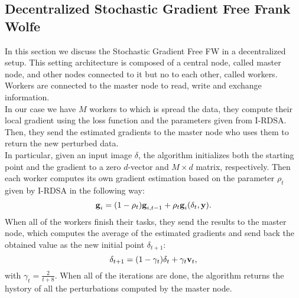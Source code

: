 \subsection{Decentralized Stochastic Gradient Free Frank Wolfe}
In this section we discuss the Stochastic Gradient Free FW in a decentralized setup. This setting architecture is composed of a central node, called master node, and other nodes connected to it but no to each other, called workers.
Workers are connected to the master node to read, write and exchange information.\\
In our case we have $M$ workers to which is spread the data, they compute their local gradient using the loss function and the parameters given from I-RDSA. Then, they send the estimated gradients to the master node who uses them to return the new perturbed data.\\
In particular, given an input image \boldmath$\delta$, the algorithm initializes both the starting point and the gradient to a zero $d$-vector and $M \times d$ matrix, respectively. Then each worker computes its own gradient estimation based on the parameter $\rho_t$ given by I-RDSA in the following way:
\[\textbf{g}_i= (1- \rho_t)\textbf{g}_{i,t-1} + \rho_t\textbf{g}_i(\text{\boldmath}\delta_t,\textbf{y}).\]
 When all of the workers finish their tasks, they send the results to the master node, which computes the average of the estimated gradients and send back the obtained value as the new initial point \boldmath$\delta_{t+1}$:
\[\text{\boldmath}\delta_{t+1} = (1-\gamma_t)\text{\boldmath}\delta_t + \gamma_t\textbf{v}_t, \]
with $\gamma_t = \frac{2}{t+8}$. When all of the iterations are done, the algorithm returns the hystory of all the perturbations computed by the master node.

